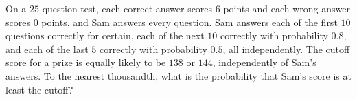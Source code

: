 On a $25$-question test, each correct answer scores $6$ points and each wrong answer scores $0$ points, and Sam answers every question. Sam answers each of the first $10$ questions correctly for certain, each of the next $10$ correctly with probability $0.8$, and each of the last $5$ correctly with probability $0.5$, all independently. The cutoff score for a prize is equally likely to be $138$ or $144$, independently of Sam's answers. To the nearest thousandth, what is the probability that Sam's score is at least the cutoff?
